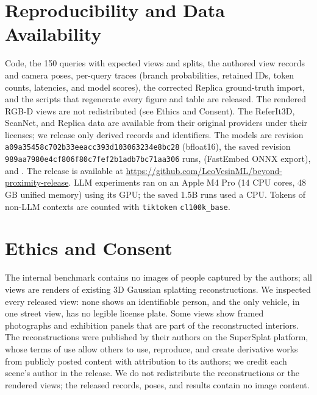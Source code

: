 \documentclass{ieeeaccess}
\begin{document}
\section{Reproducibility and Data Availability}
\label{sec:repro}
Code, the 150 queries with expected views and splits, the authored view
records and camera poses, per-query traces (branch probabilities, retained IDs,
token counts, latencies, and model scores), the corrected Replica ground-truth
import, and the scripts that regenerate every figure and table are released. The
rendered RGB-D views are not redistributed (see Ethics and Consent). The ReferIt3D, ScanNet, and Replica
data are available from their original providers under their licenses; we
release only derived records and identifiers. The models are
 revision
\texttt{a09a35458c702b33eeac\allowbreak c393d103063234e8bc28} (bfloat16), the saved
 revision
\texttt{989aa7980e4cf806f80c\allowbreak 7fef2b1adb7bc71aa306} runs,
 (FastEmbed ONNX export), and
. The release is available at
\url{https://github.com/LeoVesinML/beyond-proximity-release}. LLM experiments ran on an Apple M4 Pro (14 CPU
cores, 48\,GB unified memory) using its GPU; the saved 1.5B runs used a CPU. Tokens
of non-LLM contexts are counted with \texttt{tiktoken} \texttt{cl100k\_base}.

\section*{Ethics and Consent}
The internal benchmark contains no images of people captured by the authors;
all views are renders of existing 3D Gaussian splatting reconstructions. We
inspected every released view: none shows an identifiable person, and the only
vehicle, in one street view, has no legible license plate. Some views show
framed photographs and exhibition panels that are part of the reconstructed
interiors. The reconstructions were published by their authors on the SuperSplat
platform, whose terms of use allow others to use, reproduce, and create derivative
works from publicly posted content with attribution to its authors; we credit
each scene's author in the release. We do not redistribute the reconstructions
or the rendered views; the released records, poses, and results contain no image
content.

\end{document}
